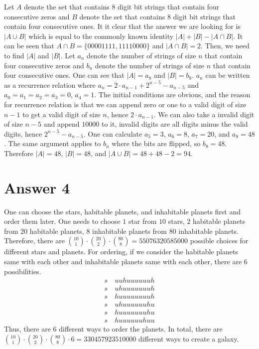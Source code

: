 \documentclass[12pt]{article}
\newcommand{\+}{\mkern2mu}
\begin{document}
Let $A$ denote the set that contains 8 digit bit strings that contain four consecutive zeros and $B$ denote the set that contains 8 digit bit strings that contain four consecutive ones. It it clear that the answer we are looking for is $|A \cup B|$ which is equal to the commonly known identity $|A| + |B| - |A \cap B|$. It can be seen that $A \cap B = \{00001111, 11110000\}$ and $|A \cap B| = 2$. Then, we need to find $|A|$ and $|B|$.
\newline
Let $a_n$ denote the number of strings of size $n$ that contain four consecutive zeros and $b_n$ denote the number of strings of size $n$ that contain four consecutive ones. One can see that $|A| = a_8$ and $|B| = b_8$.
\newline
$a_n$ can be written as a recurrence relation where $a_n = 2 \cdot a_{n-1} + 2^{n-5} - a_{n-5}$ and $a_0 = a_1 = a_2 = a_3 = 0$, $a_4 = 1$. The initial conditions are obvious, and the reason for recurrence relation is that we can append zero or one to a valid digit of size $n - 1$ to get a valid digit of size $n$, hence $2 \cdot a_{n-1}$. We can also take a invalid digit of size $n - 5$ and append $10000$ to it, invalid digits are all digits minus the valid digits, hence $2^{n-5} - a_{n-5}$. One can calculate $a_5 = 3$, $a_6 = 8$, $a_7 = 20$, and $a_8 = 48$.
\newline
The same argument applies to $b_n$ where the bits are flipped, so $b_8 = 48$. Therefore $|A| = 48$, $|B| = 48$, and $|A \cup B| = 48 + 48 - 2 = 94$.

\section*{Answer 4}

One can choose the stars, habitable planets, and inhabitable planets first and order them later. One needs to choose $1$ star from $10$ stars, $2$ habitable planets from $20$ habitable planets, $8$ inhabitable planets from $80$ inhabitable planets. Therefore, there are $\binom{10}{1} \cdot \binom{20}{2} \cdot \binom{80}{8} = \num[group-separator={,}]{55076320585000}$ possible choices for different stars and planets. For ordering, if we consider the habitable planets same with each other and inhabitable planets same with each other, there are $6$ possibilities.
\begin{gather*}
    s \quad uuhuuuuuuh \\
    s \quad uhuuuuuuuh \\
    s \quad huuuuuuuuh \\
    s \quad uhuuuuuuhu \\
    s \quad huuuuuuuhu \\
    s \quad huuuuuuhuu
\end{gather*}
Thus, there are $6$ different ways to order the planets. In total, there are $\binom{10}{1} \cdot \binom{20}{2} \cdot \binom{80}{8} \cdot 6 = \num[group-separator={,}]{330457923510000}$ different ways to create a galaxy.
\end{document}
